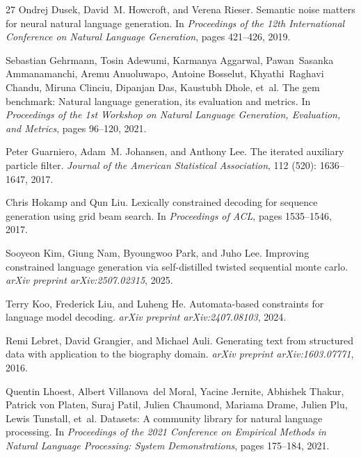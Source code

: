 \documentclass[11pt]{article}
\begin{document}
\begin{thebibliography}{27}
Ondrej Dusek, David~M. Howcroft, and Verena Rieser.
\newblock Semantic noise matters for neural natural language generation.
\newblock In \emph{Proceedings of the 12th International Conference on Natural
  Language Generation}, pages 421--426, 2019.

Sebastian Gehrmann, Tosin Adewumi, Karmanya Aggarwal, Pawan~Sasanka
  Ammanamanchi, Aremu Anuoluwapo, Antoine Bosselut, Khyathi~Raghavi Chandu,
  Miruna Clinciu, Dipanjan Das, Kaustubh Dhole, et~al.
\newblock The gem benchmark: Natural language generation, its evaluation and
  metrics.
\newblock In \emph{Proceedings of the 1st Workshop on Natural Language
  Generation, Evaluation, and Metrics}, pages 96--120, 2021.

Peter Guarniero, Adam~M. Johansen, and Anthony Lee.
\newblock The iterated auxiliary particle filter.
\newblock \emph{Journal of the American Statistical Association}, 112
  (520): 1636--1647, 2017.

Chris Hokamp and Qun Liu.
\newblock Lexically constrained decoding for sequence generation using grid
  beam search.
\newblock In \emph{Proceedings of ACL}, pages 1535--1546, 2017.

Sooyeon Kim, Giung Nam, Byoungwoo Park, and Juho Lee.
\newblock Improving constrained language generation via self-distilled twisted
  sequential monte carlo.
\newblock \emph{arXiv preprint arXiv:2507.02315}, 2025.

Terry Koo, Frederick Liu, and Luheng He.
\newblock Automata-based constraints for language model decoding.
\newblock \emph{arXiv preprint arXiv:2407.08103}, 2024.

Remi Lebret, David Grangier, and Michael Auli.
\newblock Generating text from structured data with application to the
  biography domain.
\newblock \emph{arXiv preprint arXiv:1603.07771}, 2016.

Quentin Lhoest, Albert Villanova~del Moral, Yacine Jernite, Abhishek Thakur,
  Patrick von Platen, Suraj Patil, Julien Chaumond, Mariama Drame, Julien Plu,
  Lewis Tunstall, et~al.
\newblock Datasets: A community library for natural language processing.
\newblock In \emph{Proceedings of the 2021 Conference on Empirical Methods in
  Natural Language Processing: System Demonstrations}, pages 175--184, 2021.


\end{thebibliography}
\end{document}
